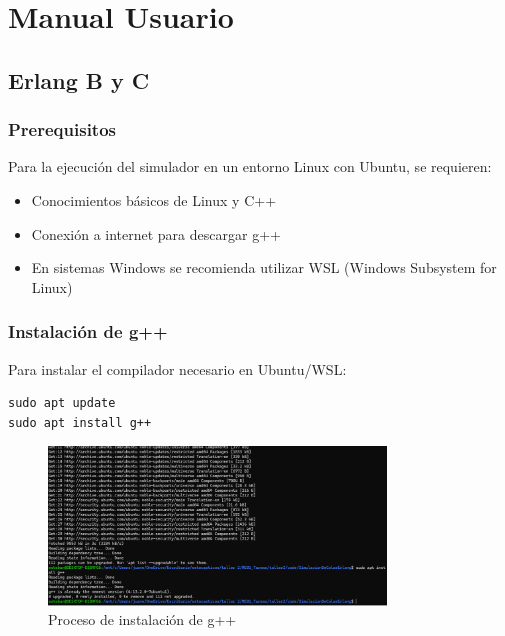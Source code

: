 \documentclass{article}
\begin{document}

\section{Manual Usuario}\label{sec:man_u}

\subsection{Erlang B y C}\label{subsec:erlang_bc}

\subsubsection{Prerequisitos}
Para la ejecución del simulador en un entorno Linux con Ubuntu, se requieren:
\begin{itemize}
    \item Conocimientos básicos de Linux y C++
    \item Conexión a internet para descargar g++
    \item En sistemas Windows se recomienda utilizar WSL (Windows Subsystem for Linux)
\end{itemize}

\subsubsection{Instalación de g++}
Para instalar el compilador necesario en Ubuntu/WSL:
\begin{verbatim}
sudo apt update
sudo apt install g++
\end{verbatim}

\begin{figure}[H]
    \centering
    \includegraphics[width=0.8\textwidth]{images/manualUsuarioErlangBC_1.png}
    \caption{Proceso de instalación de g++}
    \label{fig:instalacion}
\end{figure}
\end{document}
